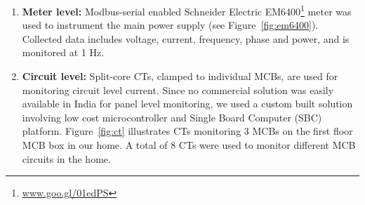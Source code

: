 \documentclass[10pt]{sensys-proc}
\newcommand{\figref}[1]{Figure~\ref{#1}}
\newcommand{\denselistbib}{
  \itemsep -.6pt\topsep-4pt\partopsep-20pt
}
\begin{document}
\begin{enumerate}[leftmargin=1em]\denselistbib
\vspace{-1.5mm}\item {} \textbf{Meter level:} Modbus-serial enabled Schneider Electric EM6400\footnote{\url{www.goo.gl/01edPS}} meter was used to instrument the main power supply (see \figref{fig:em6400}). %
Collected data includes voltage, current, frequency, phase and power, and is monitored at 1 Hz. 

\vspace{-1.5mm} \item \textbf{Circuit level:} Split-core CTs, clamped to individual MCBs, are used for monitoring circuit level current. Since no commercial solution was easily available in India for panel level monitoring, we used a custom built solution involving low cost microcontroller and Single Board Computer (SBC) platform. %
\figref{fig:ct} illustrates CTs monitoring 3 MCBs on the first floor MCB box in our home. %
A total of 8 CTs were used to monitor different MCB circuits in the home.


\end{enumerate}
\end{document}
